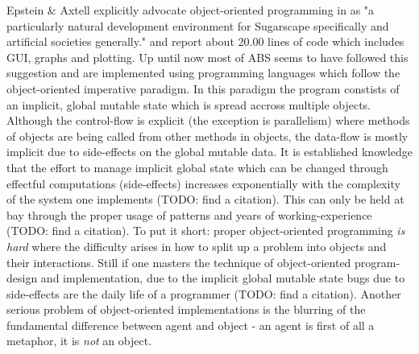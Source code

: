 Epstein \& Axtell explicitly advocate object-oriented programming in \cite{epstein_growing_1996} as "a particularly natural development environment for Sugarscape specifically and artificial societies generally." and report about 20.00 lines of code which includes GUI, graphs and plotting. Up until now most of ABS seems to have followed this suggestion and are implemented using programming languages which follow the object-oriented imperative paradigm. In this paradigm the program constists of an implicit, global mutable state which is spread accross multiple objects. Although the control-flow is explicit (the exception is parallelism) where methods of objects are being called from other methods in objects, the data-flow is mostly implicit due to side-effects on the global mutable data.
It is established knowledge that the effort to manage implicit global state which can be changed through effectful computations (side-effects) increases exponentially with the complexity of the system one implements (TODO: find a citation). This can only be held at bay through the proper usage of patterns \cite{gamma_design_1994} and years of working-experience (TODO: find a citation). To put it short: proper object-oriented programming \textit{is hard} where the difficulty arises in how to split up a problem into objects and their interactions. Still if one masters the technique of object-oriented program-design and implementation, due to the implicit global mutable state bugs due to side-effects are the daily life of a programmer (TODO: find a citation). Another serious problem of object-oriented implementations is the blurring of the fundamental difference between agent and object - an agent is first of all a metaphor, it is \textit{not} an object. 

